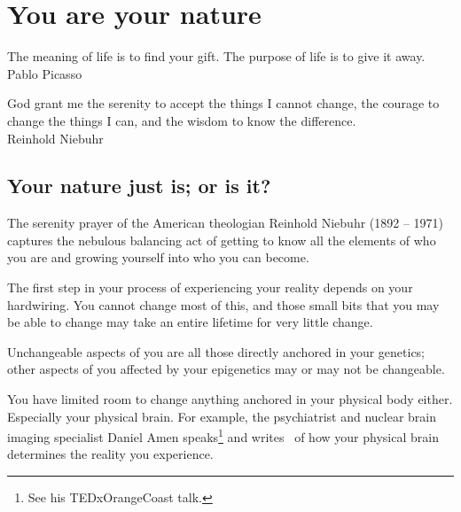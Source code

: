 ﻿%
\chapter{You are your nature}
\label{chapter:who-am-i-nature}


\begin{chapterquotation}
The meaning of life is to find your gift. The purpose of life is to give it away. \\
\raggedleft\textemdash Pablo Picasso 


\centering
God grant me the serenity to accept the things I cannot change, the courage to change the things I can, and the wisdom to know the difference. \\
\raggedleft\textemdash Reinhold Niebuhr\label{quote:niebuhr}
\end{chapterquotation}


\section{Your nature just is; or is it?}
The serenity prayer of the American theologian Reinhold Niebuhr (1892 – 1971)  captures the nebulous balancing act of getting to know all the elements of who you are and growing yourself into who you can become.


The first step in your process of experiencing your reality depends on your hardwiring. You cannot change most of this, and those small bits that you may be able to change may take an entire lifetime for very little change.


Unchangeable aspects of you are all those directly anchored in your genetics; other aspects of you affected by your epigenetics may or may not be changeable. 


You have limited room to change anything anchored in your physical body either. Especially your physical brain. For example, the psychiatrist and nuclear brain imaging specialist Daniel Amen speaks\footnote{See his TEDxOrangeCoast talk.} and writes~\cite{amen-neuroscience} of how your physical brain determines the reality you experience. 


